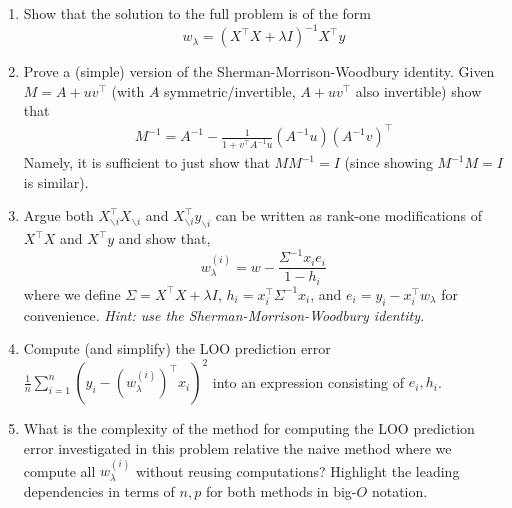 \documentclass[11pt]{article}
\begin{document}
\begin{enumerate}
    \item Show that the solution to the full problem is of the form
    \[
    w_\lambda = (X^\top X+\lambda I)^{-1}X^\top y
    \]
    \item Prove a (simple) version of the Sherman-Morrison-Woodbury identity. Given $M=A+uv^\top$ (with $A$ symmetric/invertible, $A+uv^\top$ also invertible) show that
    \begin{align}
        M^{-1} = A^{-1}-\frac{1}{1+v^\top A^{-1} u} (A^{-1} u)(A^{-1} v)^\top
    \end{align}
    Namely, it is sufficient to just show that $MM^{-1}=I$ (since showing $M^{-1}M=I$ is similar).
    \item Argue both $X_{\backslash i}^\top X_{\backslash i}$ and $X_{\backslash i}^\top y_{\backslash i}$ can be written as rank-one modifications of $X^\top X$ and $X^\top y$ and show that,
    \[
    w^{(i)}_\lambda = w - \frac{\Sigma^{-1} x_i e_i}{1-h_i}
    \]
    where we define $\Sigma = X^\top X+\lambda I$, $h_i = x_i^\top \Sigma^{-1} x_i$, and $e_i = y_i - x_i^\top w_{\lambda}$ for convenience.
    {\em Hint: use the Sherman-Morrison-Woodbury identity.}

    \item Compute (and simplify) the LOO prediction error $\frac{1}{n} \sum_{i=1}^{n} (y_i-(w^{(i)}_{\lambda})^\top x_i)^2$ into an expression consisting of $e_i, h_i$.

    \item What is the complexity of the method for computing the LOO prediction error investigated in this problem relative the naive method where we compute all $w_{\lambda}^{(i)}$ without reusing computations? Highlight the leading dependencies in terms of $n, p$ for both methods in big-$O$ notation.
\end{enumerate}
\end{document}
